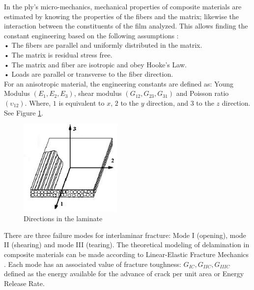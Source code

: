 In the ply's micro-mechanics, mechanical properties of composite materials are estimated by knowing the properties of the fibers and the matrix; likewise the interaction between the constituents of the film analyzed.
This allows finding the constant engineering based on the following assumptions \cite{mat}:\\
• The fibers are parallel and uniformly distributed in the matrix.\\
• The matrix is residual stress free.\\
• The matrix and fiber are isotropic and obey Hooke's Law.\\
• Loads are parallel or transverse to the fiber direction.\\

For an anisotropic material, the engineering constants are defined as: Young Modulus $(E_1,E_2,E_3)$, shear modulus $(G_{12},G_{23},G_{31})$ and Poisson ratio $(\upsilon_{12})$. Where, $1$ is equivalent to $x$, $2$ to the $y$ direction, and $3$ to the $z$ direction. See Figure \ref{fig:1}.


\begin{figure}[H]
\begin{center}
\includegraphics[width=0.45\textwidth]{Direcciones}
\caption{ Directions in the laminate \cite{imagen}}
\label{fig:1}
\end{center}       %
\end{figure}


There are three failure modes for interlaminar fracture: Mode I (opening), mode II (shearing) and mode III (tearing). The theoretical modeling of delamination in composite materials can be made according to Linear-Elastic Fracture Mechanics . Each mode has an associated value of fracture toughness: $G_{IC}, G_{IIC}, G_{IIIC}$ defined as the energy available for the advance of crack per unit area or Energy Release Rate.\\

